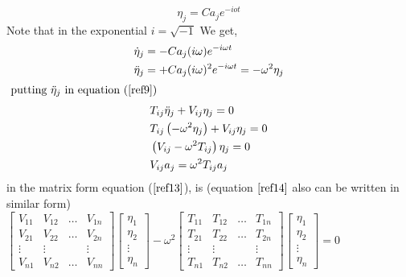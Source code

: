 \begin{equation}
\eta_{j}=C a_{j} e^{-i o t}\label{ref11}
\end{equation}
Note that in the exponential $i=\sqrt{-1}$
We get,
\begin{align}
&\dot{\eta}_{j}=-C a_{j}(i \omega) e^{-i \omega t} \notag \\
&\ddot{\eta}_{j}=+C a_{j}(i \omega)^{2} e^{-i \omega t}=-\omega^{2} \eta_{j}\label{ref12}
\end{align}
$\text { putting } \ddot{\eta}_{j} \text { in equation ($\ref{ref9}$) }$
\begin{align}
&T_{i j} \ddot{\eta}_{j}+V_{i j} \eta_{j}=0 \notag\\
&T_{i j}\left(-\omega^{2} \eta_{j}\right)+V_{i j} \eta_{j}=0 \notag\\
&\left(V_{i j}-\omega^{2} T_{i j}\right) \eta_{j}=0\label{ref13} \\
&V_{i j} a_{j}=\omega^{2} T_{i j} a_{j}\label{ref14}
\end{align}
 in the matrix form equation ($\ref{ref13}$), is (equation  $\ref{ref14}$  also can be written in similar form)\\
 $\left[\begin{array}{cccc}
 	V_{11} & V_{12} & \ldots & V_{1 n} \\
 	V_{21} & V_{22} & \ldots & V_{2 n} \\
 	\vdots & \vdots & & \vdots \\
 	V_{n 1} & V_{n 2} & \ldots & V_{n n}
 \end{array}\right]\left[\begin{array}{l}
 	\eta_{1} \\
 	\eta_{2} \\
 	\vdots \\
 	\eta_{n}
 \end{array}\right]-\omega^{2}\left[\begin{array}{cccc}
 	T_{11} & T_{12} & \ldots & T_{1 n} \\
 	T_{21} & T_{22} & \ldots & T_{2 n} \\
 	\vdots & \vdots & & \vdots \\
 	T_{n 1} & T_{n 2} & \ldots & T_{n n}
 \end{array}\right]\left[\begin{array}{l}
 	\eta_{1} \\
 	\eta_{2} \\
 	\vdots \\
 	\eta_{n}
 \end{array}\right]=0$
